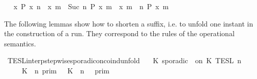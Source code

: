 \begin{isabellebody}
\ \isamarkupfalse%
\ {\isacartoucheopen}{\isacharbraceleft}x{\isachardot}\ P\ x\ n{\isacharbraceright}\ {\isasymunion}\ {\isacharbraceleft}x{\isachardot}\ {\isasymexists}m\ {\isasymge}\ Suc\ n{\isachardot}\ P\ x\ m{\isacharbraceright}\ {\isasymsubseteq}\ {\isacharbraceleft}x{\isachardot}\ {\isasymexists}m\ {\isasymge}\ n{\isachardot}\ P\ x\ m{\isacharbraceright}{\isacartoucheclose}\ \isacommand{{\isachardot}{\isachardot}}\isamarkupfalse%
\isanewline
{}\isamarkupfalse%
%
\endisatagproof
{\isafoldproof}%
%
\isadelimproof
%
\endisadelimproof
%
\isadelimdocument
%
\endisadelimdocument
%
\isatagdocument
%
\isamarkuptrue%
%
\endisatagdocument
{\isafolddocument}%
%
\isadelimdocument
%
\endisadelimdocument
%
\begin{isamarkuptext}%
The following lemmas show how  to shorten a suffix, i.e. to unfold one instant 
  in the construction of a run. They correspond to the rules of the operational 
  semantics.%
\end{isamarkuptext}\isamarkuptrue%
\isamarkupfalse%
\ TESL{\isacharunderscore}interp{\isacharunderscore}stepwise{\isacharunderscore}sporadicon{\isacharunderscore}coind{\isacharunderscore}unfold{\isacharcolon}\isanewline
\ \ {\isacartoucheopen}{\isasymlbrakk}\ K\ sporadic\ {\isasymtau}\ on\ K\ {\isasymrbrakk}\isactrlsub T\isactrlsub E\isactrlsub S\isactrlsub L\isactrlbsup {\isasymge}\ n\isactrlesup \ {\isacharequal}\isanewline
\ \ \ \ {\isasymlbrakk}\ K\ {\isasymUp}\ n\ {\isasymrbrakk}\isactrlsub p\isactrlsub r\isactrlsub i\isactrlsub m\ {\isasyminter}\ {\isasymlbrakk}\ K\ {\isasymDown}\ n\ {\isacharat}\ {\isasymtau}\ {\isasymrbrakk}\isactrlsub p\isactrlsub r\isactrlsub i\isactrlsub m\ \ \ \ \ \ \ \ %
\end{isabellebody}
